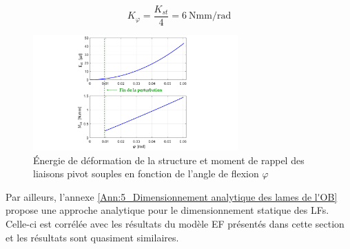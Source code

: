 \begin{equation}
		K_{\varphi} = \frac{K_{st}}{4} = 6\ \text{Nmm/rad}
		\label{eq:définition_K_phi}
\end{equation}
\begin{figure}[!ht]
	\begin{center}
		\captionsetup{justification=centering}
		\includegraphics[trim={7cm 0cm 8cm 0cm},clip, width=0.7\textwidth]{../Chap3/Figure/ANSYS_energie+moment.pdf}
		\caption{Énergie de déformation de la structure et moment de rappel des liaisons pivot souples en fonction de l'angle de flexion $\varphi$}
		\label{fig:ANSYS_energie+moment}
	\end{center}
\end{figure}

Par ailleurs, l'annexe \ref{Ann:5_Dimensionnement analytique des lames de l'OB} propose une approche analytique pour le dimensionnement statique des LFs. Celle-ci est corrélée avec les résultats du modèle EF présentés dans cette section et les résultats sont quasiment similaires. 


